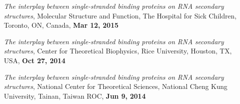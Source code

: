 \documentclass[11pt]{../yhlcv}
\begin{document}
\begin{etaremune}[leftmargin=0.26in]
\item {\it The interplay between single-stranded binding proteins on RNA secondary structures},
	Molecular Structure and Function, The Hospital for Sick Children, Toronto, ON, Canada, {\bf Mar 12, 2015}

\item {\it The interplay between single-stranded binding proteins on RNA secondary structures},
	Center for Theoretical Biophysics, Rice University, Houston, TX, USA, {\bf Oct 27, 2014}

\item {\it The interplay between single-stranded binding proteins on RNA secondary structures}, National Center for Theoretical Sciences, National Cheng Kung University, Tainan, Taiwan ROC, {\bf Jun 9, 2014}

\end{etaremune}
\end{document}

